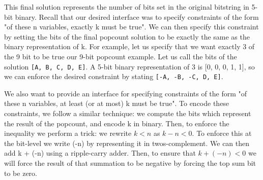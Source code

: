 This final solution represents the number of bits set in the original bitstring in 5-bit binary. Recall that our desired interface was to specify constraints of the form "of these n variables, exactly k must be true". We can then specify this constraint by setting the bits of the final popcount solution to be exactly the same as the binary representation of k. For example, let us specify that we want exactly 3 of the 9 bit to be true our 9-bit popcount example. Let us call the bits of the solution \texttt{[A, B, C, D, E]}. A 5-bit binary representation of 3 is [0, 0, 0, 1, 1], so we can enforce the desired constraint by stating \texttt{[-A, -B, -C, D, E]}.

We also want to provide an interface for specifying constraints of the form "of these n variables, at least (or at most) k must be true". To encode these constraints, we follow a similar technique: we compute the bits which represent the result of the popcount, and encode k in binary. Then, to enforce the inequality we perform a trick: we rewrite $ k < n $ as $ k - n < 0$. To enforce this at the bit-level we write (-n) by representing it in twos-complement. We can then add k + (-n) using a ripple-carry adder. Then, to ensure that $k + (-n) < 0$ we will force the result of that summation to be negative by forcing the top sum bit to be zero.
